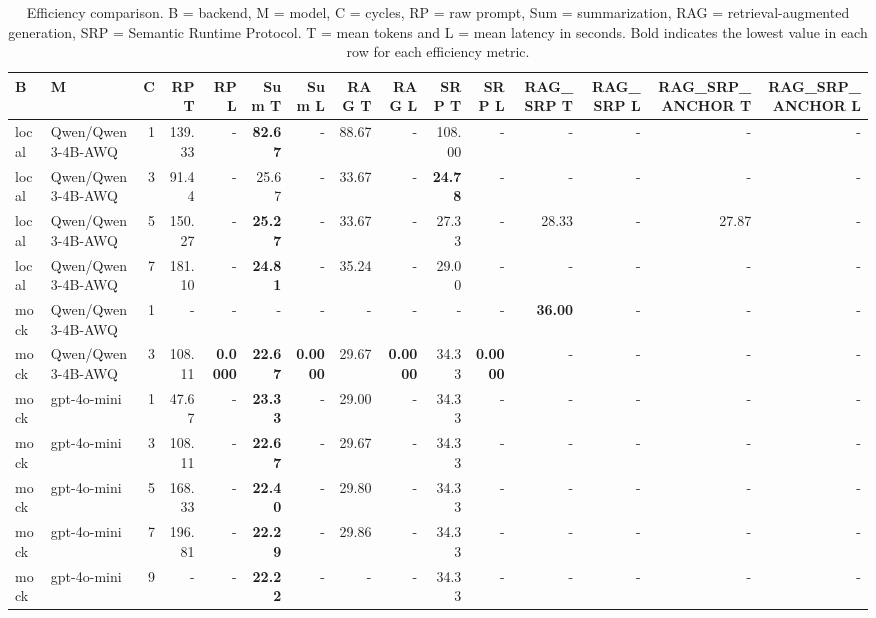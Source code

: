 \begin{table}[t]
\centering
\setlength{\tabcolsep}{4pt}
\scriptsize
\begin{tabular}{llrrrrrrrrrrrrr}
\toprule
B & M & C & RP T & RP L & Sum T & Sum L & RAG T & RAG L & SRP T & SRP L & RAG_SRP T & RAG_SRP L & RAG_SRP_ANCHOR T & RAG_SRP_ANCHOR L \\
\midrule
local & Qwen/Qwen3-4B-AWQ & 1 & 139.33 & - & \textbf{82.67} & - & 88.67 & - & 108.00 & - & - & - & - & - \\
local & Qwen/Qwen3-4B-AWQ & 3 & 91.44 & - & 25.67 & - & 33.67 & - & \textbf{24.78} & - & - & - & - & - \\
local & Qwen/Qwen3-4B-AWQ & 5 & 150.27 & - & \textbf{25.27} & - & 33.67 & - & 27.33 & - & 28.33 & - & 27.87 & - \\
local & Qwen/Qwen3-4B-AWQ & 7 & 181.10 & - & \textbf{24.81} & - & 35.24 & - & 29.00 & - & - & - & - & - \\
mock & Qwen/Qwen3-4B-AWQ & 1 & - & - & - & - & - & - & - & - & \textbf{36.00} & - & - & - \\
mock & Qwen/Qwen3-4B-AWQ & 3 & 108.11 & \textbf{0.0000} & \textbf{22.67} & \textbf{0.0000} & 29.67 & \textbf{0.0000} & 34.33 & \textbf{0.0000} & - & - & - & - \\
mock & gpt-4o-mini & 1 & 47.67 & - & \textbf{23.33} & - & 29.00 & - & 34.33 & - & - & - & - & - \\
mock & gpt-4o-mini & 3 & 108.11 & - & \textbf{22.67} & - & 29.67 & - & 34.33 & - & - & - & - & - \\
mock & gpt-4o-mini & 5 & 168.33 & - & \textbf{22.40} & - & 29.80 & - & 34.33 & - & - & - & - & - \\
mock & gpt-4o-mini & 7 & 196.81 & - & \textbf{22.29} & - & 29.86 & - & 34.33 & - & - & - & - & - \\
mock & gpt-4o-mini & 9 & - & - & \textbf{22.22} & - & - & - & 34.33 & - & - & - & - & - \\
\bottomrule
\end{tabular}
\caption{Efficiency comparison. B = backend, M = model, C = cycles, RP = raw prompt, Sum = summarization, RAG = retrieval-augmented generation, SRP = Semantic Runtime Protocol. T = mean tokens and L = mean latency in seconds. Bold indicates the lowest value in each row for each efficiency metric.}
\label{tab:srp-efficiency-table}
\end{table}
